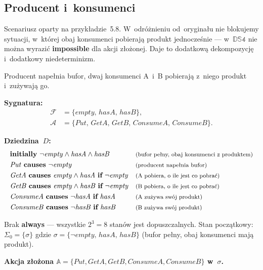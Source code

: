 \documentclass[11pt,a4paper]{article}
\newif\ifshowbib
\newcommand{\bibonly}[1]{\ifshowbib#1\fi}
\renewcommand{\cite}[2][]{\unskip}%
\newcommand{\causes}{\textbf{causes}}
\renewcommand{\iff}{\textbf{if}}
\newcommand{\initially}{\textbf{initially}}
\newcommand{\always}{\textbf{always}}
\newcommand{\impossible}{\textbf{impossible}}
\newcommand{\cmt}[1]{\text{\footnotesize\normalfont (#1)}}
\theoremstyle{definition}
\begin{document}
\subsection{Producent i~konsumenci}

\noindent Scenariusz oparty na przykładzie~5.8\bibonly{ z~\cite{rw05}}.
W~odróżnieniu od~oryginału nie blokujemy sytuacji, w~której obaj
konsumenci pobierają produkt jednocześnie --- w~$\mathbb{DS4}$
nie można wyrazić \impossible{} dla akcji złożonej.
Daje to dodatkową dekompozycję i~dodatkowy niedeterminizm.

Producent napełnia bufor, dwaj konsumenci A~i~B pobierają z~niego
produkt i~zużywają go.

\medskip
\noindent\textbf{Sygnatura:}
\begin{align*}
  \mathcal{F} &= \{\mathit{empty},\, \mathit{hasA},\, \mathit{hasB}\}, \\
  \mathcal{A} &= \{\mathit{Put},\, \mathit{GetA},\, \mathit{GetB},\,
                   \mathit{ConsumeA},\, \mathit{ConsumeB}\}.
\end{align*}

\medskip
\noindent\textbf{Dziedzina~$D$:}
{\small
\begin{align*}
  &\initially\ \neg\mathit{empty} \land \mathit{hasA} \land \mathit{hasB}
    && \cmt{bufor pełny, obaj konsumenci z~produktem} \\
  &\mathit{Put}\ \causes\ \neg\mathit{empty}
    && \cmt{producent napełnia bufor} \\
  &\mathit{GetA}\ \causes\ \mathit{empty} \land \mathit{hasA}\ \iff\ \neg\mathit{empty}
    && \cmt{A~pobiera, o~ile jest co pobrać} \\
  &\mathit{GetB}\ \causes\ \mathit{empty} \land \mathit{hasB}\ \iff\ \neg\mathit{empty}
    && \cmt{B~pobiera, o~ile jest co pobrać} \\
  &\mathit{ConsumeA}\ \causes\ \neg\mathit{hasA}\ \iff\ \mathit{hasA}
    && \cmt{A~zużywa swój produkt} \\
  &\mathit{ConsumeB}\ \causes\ \neg\mathit{hasB}\ \iff\ \mathit{hasB}
    && \cmt{B~zużywa swój produkt}
\end{align*}
}

Brak \always{} --- wszystkie $2^3 = 8$ stanów jest dopuszczalnych.
Stan początkowy: $\Sigma_0 = \{\sigma\}$ gdzie
$\sigma = \{\neg\mathit{empty},\, \mathit{hasA},\, \mathit{hasB}\}$
(bufor pełny, obaj konsumenci mają produkt).

\medskip
\noindent\textbf{Akcja złożona $\mathbb{A} = \{\mathit{Put}, \mathit{GetA}, \mathit{GetB},
\mathit{ConsumeA}, \mathit{ConsumeB}\}$ w~$\sigma$.}
\end{document}
